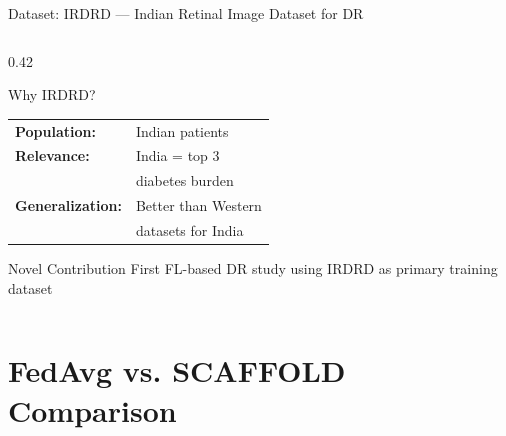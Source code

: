 \documentclass[aspectratio=169, 11pt]{beamer}
\begin{document}
\begin{frame}{Dataset: IRDRD --- Indian Retinal Image Dataset for DR}
\begin{columns}[T]
\begin{column}{0.42\textwidth}
\begin{block}{Why IRDRD?}
\begin{tabular}{ll}
          \textbf{Population:}    & Indian patients \\
          \textbf{Relevance:}     & India = top 3 \\
                                  & diabetes burden \\
          \textbf{Generalization:} & Better than Western \\
                                   & datasets for India \\
        \end{tabular}
      \end{block}
      \begin{alertblock}{Novel Contribution}\small
        First FL-based DR study using IRDRD as primary training dataset
      \end{alertblock}
    \end{column}
  \end{columns}
\end{frame}

\section{FedAvg vs. SCAFFOLD Comparison}
\end{document}
